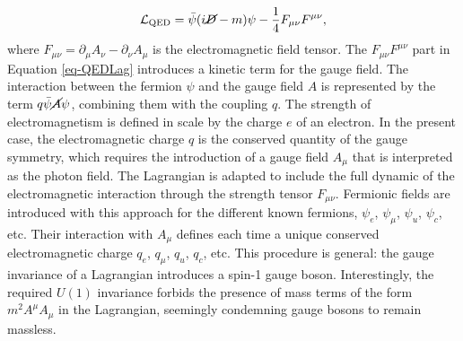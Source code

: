 \begin{equation}\label{eq-QEDLag}
    \mathcal{L}_{\text{QED}} = \bar{\psi} (i \cancel{D}- m) \psi - \frac{1}{4} F_{\mu\nu} F^{\mu\nu},
\end{equation}
where $F_{\mu\nu} = \partial_{\mu} A_\nu - \partial_\nu A_{\mu} $ is the electromagnetic field tensor. The $F_{\mu\nu} F^{\mu\nu}$ part in Equation \ref{eq-QEDLag} introduces a kinetic term for the gauge field. The interaction between the fermion $\psi$ and the gauge field $A$ is represented by the term $q \bar{\psi} \cancel{A} \psi$, combining them with the coupling $q$. The strength of electromagnetism is defined in scale by the charge $e$ of an electron. In the present case, the electromagnetic charge $q$ is the conserved quantity of the gauge symmetry, which requires the introduction of a gauge field $A_\mu$ that is interpreted as the photon field. The Lagrangian is adapted to include the full dynamic of the electromagnetic interaction through the strength tensor $F_{\mu\nu}$. Fermionic fields are introduced with this approach for the different known fermions, $\psi_e$, $\psi_{\mu}$, $\psi_u$, $\psi_c$, etc. Their interaction with $A_\mu$ defines each time a unique conserved electromagnetic charge $q_e$, $q_{\mu}$, $q_u$, $q_c$, etc. This procedure is general: the gauge invariance of a Lagrangian introduces a spin-1 gauge boson. Interestingly, the required $U(1)$ invariance forbids the presence of mass terms of the form $m^2 A^{\mu} A_{\mu}$ in the Lagrangian, seemingly condemning gauge bosons to remain massless. 

